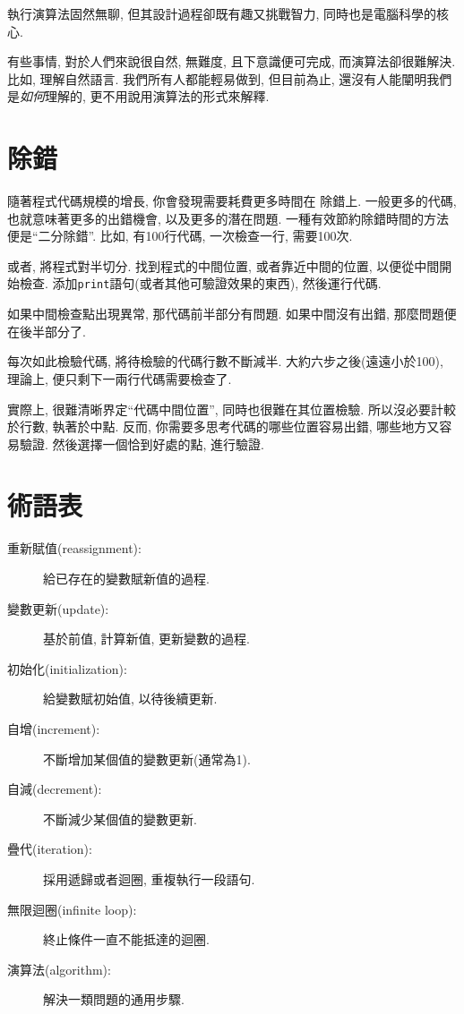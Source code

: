 \documentclass[10pt]{book}
\begin{document}
執行演算法固然無聊, 但其設計過程卻既有趣又挑戰智力, 
同時也是電腦科學的核心. 

有些事情, 對於人們來說很自然, 無難度, 且下意識便可完成, 
而演算法卻很難解決. 
比如, 理解自然語言. 我們所有人都能輕易做到, 
但目前為止, 還沒有人能闡明我們是{\em 如何}理解的, 
更不用說用演算法的形式來解釋. 

\section{除錯}
\label{bisectbug}
隨著程式代碼規模的增長, 你會發現需要耗費更多時間在
除錯上. 一般更多的代碼, 也就意味著更多的出錯機會, 
以及更多的潛在問題. 
一種有效節約除錯時間的方法便是``二分除錯''.
比如, 有100行代碼, 一次檢查一行, 需要100次. 

或者, 將程式對半切分. 找到程式的中間位置, 或者靠近中間的位置, 
以便從中間開始檢查. 添加{\tt print}語句(或者其他可驗證效果的東西), 
然後運行代碼. 

如果中間檢查點出現異常, 那代碼前半部分有問題. 
如果中間沒有出錯, 那麼問題便在後半部分了. 

每次如此檢驗代碼, 將待檢驗的代碼行數不斷減半. 大約六步之後(遠遠小於100), 
理論上, 便只剩下一兩行代碼需要檢查了. 

實際上, 很難清晰界定``代碼中間位置'', 同時也很難在其位置檢驗. 
所以沒必要計較於行數, 執著於中點. 
反而, 你需要多思考代碼的哪些位置容易出錯, 哪些地方又容易驗證. 
然後選擇一個恰到好處的點, 進行驗證. 



\section{術語表}

\begin{description}

\item[重新賦值(reassignment):] 給已存在的變數賦新值的過程. 

\item[變數更新(update):] 基於前值, 計算新值, 更新變數的過程. 

\item[初始化(initialization):] 給變數賦初始值, 以待後續更新. 

\item[自增(increment):] 不斷增加某個值的變數更新(通常為1). 

\item[自減(decrement):] 不斷減少某個值的變數更新. 

\item[疊代(iteration):] 採用遞歸或者迴圈, 重複執行一段語句. 

\item[無限迴圈(infinite loop):] 終止條件一直不能抵達的迴圈. 

\item[演算法(algorithm):]  解決一類問題的通用步驟. 

\end{description}
\end{document}
